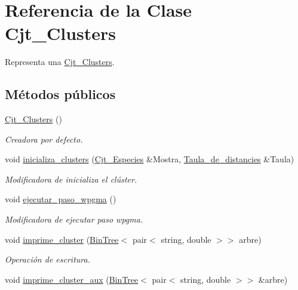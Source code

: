 \hypertarget{class_cjt___clusters}{}\section{Referencia de la Clase Cjt\+\_\+\+Clusters}
\label{class_cjt___clusters}


Representa una \hyperlink{class_cjt___clusters}{Cjt\+\_\+\+Clusters}.  


\subsection*{Métodos públicos}
\begin{DoxyCompactItemize}
\item 
\hyperlink{class_cjt___clusters_a2e55759944a78043744103e19dd87c1c}{Cjt\+\_\+\+Clusters} ()
\begin{DoxyCompactList}\small\item\em Creadora por defecto. \end{DoxyCompactList}\item 
void \hyperlink{class_cjt___clusters_a7dec4a423a1dbcf6d0351e00dd653eee}{inicializa\+\_\+clusters} (\hyperlink{class_cjt___especies}{Cjt\+\_\+\+Especies} \&Mostra, \hyperlink{class_taula__de__distancies}{Taula\+\_\+de\+\_\+distancies} \&Taula)
\begin{DoxyCompactList}\small\item\em Modificadora de inicializa el clúster. \end{DoxyCompactList}\item 
void \hyperlink{class_cjt___clusters_a1656b81e5200625b44c8f138c09af068}{ejecutar\+\_\+paso\+\_\+wpgma} ()
\begin{DoxyCompactList}\small\item\em Modificadora de ejecutar paso wpgma. \end{DoxyCompactList}\item 
void \hyperlink{class_cjt___clusters_a284f66b3e8c47eded1e24af805b81505}{imprime\+\_\+cluster} (\hyperlink{class_bin_tree}{Bin\+Tree}$<$ pair$<$ string, double $>$$>$ arbre)
\begin{DoxyCompactList}\small\item\em Operación de escritura. \end{DoxyCompactList}\item 
void \hyperlink{class_cjt___clusters_a19510eceda5d5bf39d7091a28bf5f00c}{imprime\+\_\+cluster\+\_\+aux} (\hyperlink{class_bin_tree}{Bin\+Tree}$<$ pair$<$ string, double $>$$>$ \&arbre)

\end{DoxyCompactItemize}
